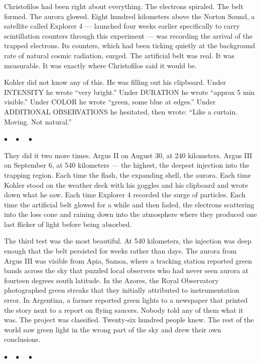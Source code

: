 \documentclass[12pt, letterpaper]{article}
\begin{document}
Christofilos had been right about everything. The electrons spiraled. The belt formed. The aurora glowed. Eight hundred kilometers above the Norton Sound, a satellite called Explorer 4 --- launched four weeks earlier specifically to carry scintillation counters through this experiment --- was recording the arrival of the trapped electrons. Its counters, which had been ticking quietly at the background rate of natural cosmic radiation, surged. The artificial belt was real. It was measurable. It was exactly where Christofilos said it would be.

Kohler did not know any of this. He was filling out his clipboard. Under INTENSITY he wrote ``very bright.'' Under DURATION he wrote ``approx 5 min visible.'' Under COLOR he wrote ``green, some blue at edges.'' Under ADDITIONAL OBSERVATIONS he hesitated, then wrote: ``Like a curtain. Moving. Not natural.''

\begin{center}
$\bullet\quad\bullet\quad\bullet$
\end{center}

They did it two more times. Argus II on August 30, at 240 kilometers. Argus III on September 6, at 540 kilometers --- the highest, the deepest injection into the trapping region. Each time the flash, the expanding shell, the aurora. Each time Kohler stood on the weather deck with his goggles and his clipboard and wrote down what he saw. Each time Explorer 4 recorded the surge of particles. Each time the artificial belt glowed for a while and then faded, the electrons scattering into the loss cone and raining down into the atmosphere where they produced one last flicker of light before being absorbed.

The third test was the most beautiful. At 540 kilometers, the injection was deep enough that the belt persisted for weeks rather than days. The aurora from Argus III was visible from Apia, Samoa, where a tracking station reported green bands across the sky that puzzled local observers who had never seen aurora at fourteen degrees south latitude. In the Azores, the Royal Observatory photographed green streaks that they initially attributed to instrumentation error. In Argentina, a farmer reported green lights to a newspaper that printed the story next to a report on flying saucers. Nobody told any of them what it was. The project was classified. Twenty-six hundred people knew. The rest of the world saw green light in the wrong part of the sky and drew their own conclusions.

\begin{center}
$\bullet\quad\bullet\quad\bullet$
\end{center}
\end{document}
